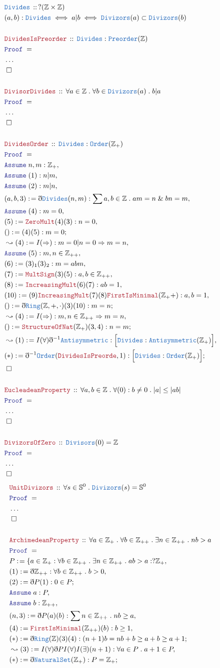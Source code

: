 \documentclass[12pt]{scrartcl}
\newcommand{\TYPE}[1]{\textcolor{NavyBlue}{\mathtt{#1}}}
\newcommand{\LOGIC}[1]{\textcolor{Blue}{\mathtt{#1}}}
\newcommand{\THM}[1]{\textcolor{Maroon}{\mathtt{#1}}}
\renewcommand{\.}{\; . \;}
\newcommand{\de}{: \kern 0.1pc =}
\newcommand{\Theorem}[2]{& \THM{#1} \, :: \, #2 \\ & \Proof = \\ }
\newcommand{\DeclareType}[2]{& \TYPE{#1} \, :: \, #2 \\}
\newcommand{\DefineNamedType}[4]{& #1 : \TYPE{#2} \iff #3 \iff #4 \\}
\newcommand{\Page}[1]{ \begin{align*} #1 \end{align*}   }
\newcommand{ \bd }{ \ByDef }
\newcommand{\NoProof}{ & \ldots \\ \EndProof}
\renewcommand{\And}{\; \& \;}
\newcommand{\Int}{\mathbb{Z} }
\newcommand{\Say}[3]{& #1 \de #2 : #3, \\}
\newcommand{\Conclude}[3]{& #1 \de #2 : #3; \\}
\newcommand{\Derive}[3]{& \leadsto #1 \de #2 : #3, \\}
\newcommand{\Assume}[2]{& \LOGIC{Assume} \; #1 : #2, \\}
\newcommand{\QED}{\; \square}
\newcommand{\EndProof}{& \QED \\}
\newcommand{\ByDef}{\eth}
\newcommand{\Proof}{\LOGIC{Proof} \; }
\begin{document}
\Page{
	\DeclareType{Divides}{?(\Int \times \Int)}
	\DefineNamedType{(a,b)}{Divides}{a | b}{\TYPE{Divizors}(a) \subset \TYPE{Divizors}(b)}
	\\
	\Theorem{DividesIsPreorder}{\TYPE{Divides} : \TYPE{Preorder}(\Int)}
	\NoProof
	\\
	\Theorem{DivisorDivides}{\forall a \in \Int \. \forall b \in \TYPE{Divizors}(a) \. b | a}
	\NoProof
	\\
	\Theorem{DividesOrder}{\TYPE{Divides} : \TYPE{Order}(\Int_+)}
	\Assume{n,m}{\Int_+}
	\Assume{(1)}{n|m}
	\Assume{(2)}{m|n}
	\Say{(a,b,3)}{\bd \TYPE{Divides}(n,m)}{ \sum a,b \in \Int \. am = n \And bn = m  }
	\Assume{(4)}{m = 0 }
	\Say{(5)}{\THM{ZeroMult}(4)(3)}{n = 0}
	\Conclude{()}{(4)(5)}{m = 0}
	\Derive{(4)}{I(\Rightarrow)}{m = 0|n = 0 \Rightarrow m = n}             
	\Assume{(5)}{ m,n \in \Int_{++} }
	\Say{(6)}{(3)_1(3)_2}{  m = abm   }
	\Say{(7)}{\THM{MultSign}(3)(5)}{ a,b \in \Int_{++} }
	\Say{(8)}{\THM{IncreasingMult}(6)(7)}{ab = 1}
	\Say{(10)}{(9)\THM{IncreasingMult}(7)(8)\THM{FirstIsMinimal}(\Int_++)}{a,b = 1}
	\Conclude{()}{\bd \TYPE{Ring}(\Int,+,\cdot)(3)(10)}{m = n}
	\Derive{(4)}{I(\Rightarrow)}{m,n \in \Int_{++} \Rightarrow m = n}
	\Conclude{()}{\THM{StructureOfNat}(\Int_+)(3,4)}{ n = m }
	\Derive{(1)}{I(\forall)\bd^{-1} \TYPE{Antisymmetric}}{\Big[ \TYPE{Divides} : \TYPE{Antisymmetric}(\Int_+) \Big]}
	\Conclude{(*)}{\bd^{-1} \TYPE{Order}(\THM{DividesIsPreorde},1)}{\Big[\TYPE{Divides} : \TYPE{Order}(\Int_+)\Big]}
	\EndProof
	\\
	\Theorem{EucleadeanProperty}{\forall a,b \in \Int \. \forall (0) :  b \neq 0 \. |a| \le |ab|}
	\NoProof 
	\\
	\Theorem{DivizorsOfZero}{\TYPE{Divisors}(0) = \Int }
	\NoProof
}\Page{
	\Theorem{UnitDivizors}{\forall s \in \mathbb{S}^0 \. \TYPE{Divizors}(s) = \mathbb{S}^0 }
	\NoProof
	\\
	\Theorem{ArchimedeanProperty}{\forall a \in \Int_+ \. \forall b \in \Int_{++} \. \exists n \in \Int_{++} \. nb > a}
	\Say{P}{\{ a \in \Int_+ : \forall b \in \Int_{++} \. \exists n \in \Int_{++} \. ab > a   }{?\Int_{+}}
	\Say{(1)}{\bd \Int_{++}}{\forall b \in \Int_{++} \. b > 0}
	\Conclude{(2)}{\bd P (1)}{0 \in P}
	\Assume{a}{P}
	\Assume{b}{\Int_{++}}
	\Say{(n,3)}{\bd P(a)(b)}{\sum n \in \Int_{++} \. nb \ge a}
	\Say{(4)}{\THM{FirstIsMinimal}(\Int_{++})(b)}{b \ge 1}
	\Conclude{(*)}{\bd \TYPE{Ring}(\Int)(3)(4)}{(n + 1)b = nb + b \ge a + b \ge a + 1}
	\Derive{(3)}{I(\forall)\bd P I(\forall)I(\exists)(n + 1)}{ \forall a \in P \. a + 1 \in P    }
	\Conclude{(*)}{\bd \TYPE{NaturalSet}(\Int_+)}{P = \Int_+}
}
\end{document}
